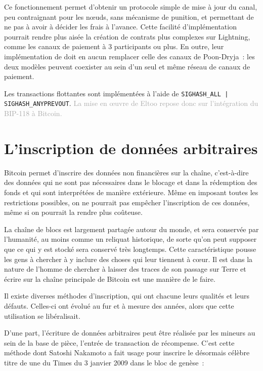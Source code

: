 Ce fonctionnement permet d'obtenir un protocole simple de mise à jour du canal, peu contraignant pour les nœuds, sans mécanisme de punition, et permettant de ne pas à avoir à décider les frais à l'avance. Cette facilité d'implémentation pourrait rendre plus aisée la création de contrats plus complexes sur Lightning, comme les canaux de paiement à 3 participants ou plus. En outre, leur implémentation de doit en aucun remplacer celle des canaux de Poon-Dryja~: les deux modèles peuvent coexister au sein d'un seul et même réseau de canaux de paiement.

Les transactions flottantes sont implémentées à l'aide de \texttt{SIGHASH\_ALL | SIGHASH\_ANYPREVOUT}. \textcolor{darkgray}{La mise en œuvre de Eltoo repose donc sur l'intégration du BIP-118 à Bitcoin.}

\section*{L'inscription de données arbitraires}

Bitcoin permet d'inscrire des données non financières sur la chaîne, c'est-à-dire des données qui ne sont pas nécessaires dans le blocage et dans la rédemption des fonds et qui sont interprétées de manière extérieure. Même en imposant toutes les restrictions possibles, on ne pourrait pas empêcher l'inscription de ces données, même si on pourrait la rendre plus coûteuse.

La chaîne de blocs est largement partagée autour du monde, et sera conservée par l'humanité, au moins comme un reliquat historique, de sorte qu'on peut supposer que ce qui y est stocké sera conservé très longtemps. Cette caractéristique pousse les gens à chercher à y inclure des choses qui leur tiennent à cœur. Il est dans la nature de l'homme de chercher à laisser des traces de son passage sur Terre et écrire sur la chaîne principale de Bitcoin est une manière de le faire.

Il existe diverses méthodes d'inscription, qui ont chacune leurs qualités et leurs défauts. Celles-ci ont évolué au fur et à mesure des années, alors que cette utilisation se libéralisait.

D'une part, l'écriture de données arbitraires peut être réalisée par les mineurs au sein de la base de pièce, l'entrée de transaction de récompense. C'est cette méthode dont Satoshi Nakamoto a fait usage pour inscrire le désormais célèbre titre de une du Times du 3 janvier 2009 dans le bloc de genèse~:

